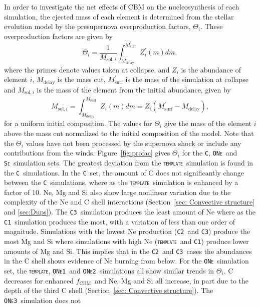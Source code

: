 \documentclass[useAMS,usenatbib]{mn2e}
\newcommand{\fcbm}{\ensuremath{f_\mathrm{CBM}}}
\newcommand{\template}{\textsc{\texttt{template}}}
\newcommand{\Ca}{\textsc{\texttt{C1}}}
\newcommand{\Cb}{\textsc{\texttt{C2}}}
\newcommand{\Cc}{\textsc{\texttt{C3}}}
\newcommand{\ONea}{\textsc{\texttt{ONe1}}}
\newcommand{\ONeb}{\textsc{\texttt{ONe2}}}
\newcommand{\ONec}{\textsc{\texttt{ONe3}}}
\newcommand{\C}{\textsc{\texttt{C}}}
\newcommand{\ONe}{\textsc{\texttt{ONe}}}
\newcommand{\Si}{\textsc{\texttt{Si}}}
\begin{document}
In order to investigate the net effects of CBM on the nucleosynthesis of each simulation, the ejected mass of each element is determined from the stellar evolution model by the presupernova overproduction factors, $\Theta_{i}$. These overproduction factors \citep{Pignatari2016,Ritter2017} are given by
\begin{equation}
\Theta_{i} = \frac{1}{M_{\mathrm{sol}, i}}{\int^{M^{\prime}_{\mathrm{surf}}}_{M_{\mathrm{delay}}}Z^{\prime}_{i}(m)dm},
\end{equation} \label{eq:2}
where the primes denote values taken at collapse, and $Z_{i}$ is the abundance of element $i$, $M_{\mathrm{delay}}$ is the mass cut, $M^{\prime}_{\mathrm{surf}}$ is the mass of the simulation at collapse and $M_{\mathrm{sol}, i}$ is the mass of the element from the initial abundance, given by
\begin{equation}
M_{\mathrm{sol}, i} =\int^{M^{\prime}_{\mathrm{surf}}}_{M_{\mathrm{delay}}}Z_{i}(m)dm = Z_{i}(M^{\prime}_{\mathrm{surf}} - M_{\mathrm{delay}}),
\end{equation} \label{eq:3}
for a uniform initial composition. The values for $\Theta_{i}$ give the mass of the element $i$ above the mass cut normalized to the initial composition of the model. Note that the $\Theta_{i}$ values have not been processed by the supernova shock or include any contributions from the winds. Figure~\ref{fig:profac} gives
$\Theta_{i}$ for the \C, \ONe~and \Si~simulation sets. The greatest
deviation from the \template\ simulation is found in the \C\ simulations. In
the \C\ set, the amount of C does not significantly change between the 
\C~simulations, where as the \template\ simulation is enhanced by a factor of
10. Ne, Mg and Si also show large nonlinear variation due to the complexity of
the Ne and C shell interactions (Section~\ref{sec: Convective structure} and
\ref{sec:Dups}).  The \Cc\ simulation produces the least amount of Ne where as
the \Ca\ simulation produces the most, with a variation of less than one order of
magnitude. Simulations with the lowest Ne production (\Cb\ and \Cc) produce
the most Mg and Si where simulations with high Ne (\template\ and \Ca) produce
lower amounts of Mg and Si. This implies that in the \Cb\ and \Cc\ cases the
abundances in the C shell shows evidence of Ne burning from below. For the
\ONe\ simulation set, the \template, \ONea\ and \ONeb\ simulations all show
similar trends in $\Theta_{i}$. C decreases for enhanced \fcbm\ and Ne, Mg
and Si all increase, in part due to the depth of the third C shell
(Section~\ref{sec: Convective structure}). The \ONec\ simulation does not
\end{document}
